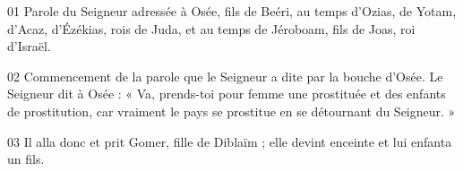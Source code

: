 01 Parole du Seigneur adressée à Osée, fils de Beéri, au temps d’Ozias, de Yotam, d’Acaz, d’Ézékias, rois de Juda, et au temps de Jéroboam, fils de Joas, roi d’Israël.

02 Commencement de la parole que le Seigneur a dite par la bouche d’Osée. Le Seigneur dit à Osée : « Va, prends-toi pour femme une prostituée et des enfants de prostitution, car vraiment le pays se prostitue en se détournant du Seigneur. »

03 Il alla donc et prit Gomer, fille de Diblaïm ; elle devint enceinte et lui enfanta un fils.
